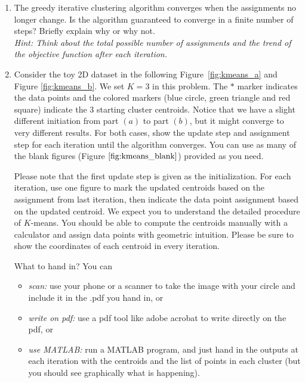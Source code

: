 \begin{enumerate}
\item {} The greedy iterative clustering algorithm converges when the assignments no longer change. Is the algorithm guaranteed to converge in a finite number of steps? Briefly explain why or why not.\\
{\em Hint: Think about the total possible number of assignments and the trend of the objective function after each iteration.}


\item {} Consider the toy 2D dataset in the following
  Figure~\ref{fig:kmeans_a} and Figure \ref{fig:kmeans_b}. We set $K = 3$ in this problem. The $*$ marker indicates the
  data points and the colored markers (blue circle, green triangle and red square) indicate the 3 starting cluster centroids. 
  Notice that we have a slight different initiation from part $(a)$ to part $(b)$, but it might converge to very different results. 
  For both cases, show the update step and assignment step for each iteration until the algorithm converges. 
  You can use as many of the blank figures (Figure$~\ref{fig:kmeans_blank}$) provided as you need.

Please note that the first update step is given as the
initialization. For each iteration, use one figure to mark the updated
centroids based on the assignment from last iteration, then indicate the data point assignment based on the updated centroid. We expect you to
understand the detailed procedure of $K$-means. You should be able to
compute the centroids manually with a calculator and assign data
points with geometric intuition. Please be sure to show the
coordinates of each centroid in every iteration.

What to hand in? You can
\begin{itemize}
\item \textit{scan:} use your phone or a scanner to take the image with your circle
and include it in the .pdf you hand in, or
\item \textit{write on pdf:} use a pdf tool like adobe acrobat to write directly on the pdf, or
\item \textit{use MATLAB:} run a MATLAB program, and just hand in the outputs at each iteration with the centroids and the list of points in each cluster (but you should see graphically what is happening).
\end{itemize}


\end{enumerate}
